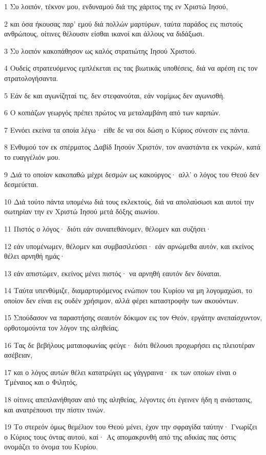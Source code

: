 \par 1 Συ λοιπόν, τέκνον μου, ενδυναμού διά της χάριτος της εν Χριστώ Ιησού,
\par 2 και όσα ήκουσας παρ' εμού διά πολλών μαρτύρων, ταύτα παράδος εις πιστούς ανθρώπους, οίτινες θέλουσιν είσθαι ικανοί και άλλους να διδάξωσι.
\par 3 Συ λοιπόν κακοπάθησον ως καλός στρατιώτης Ιησού Χριστού.
\par 4 Ουδείς στρατευόμενος εμπλέκεται εις τας βιωτικάς υποθέσεις, διά να αρέση εις τον στρατολογήσαντα.
\par 5 Εάν δε και αγωνίζηταί τις, δεν στεφανούται, εάν νομίμως δεν αγωνισθή.
\par 6 Ο κοπιάζων γεωργός πρέπει πρώτος να μεταλαμβάνη από των καρπών.
\par 7 Εννόει εκείνα τα οποία λέγω· είθε δε να σοι δώση ο Κύριος σύνεσιν εις πάντα.
\par 8 Ενθυμού τον εκ σπέρματος Δαβίδ Ιησούν Χριστόν, τον αναστάντα εκ νεκρών, κατά το ευαγγέλιόν μου.
\par 9 Διά το οποίον κακοπαθώ μέχρι δεσμών ως κακούργος· αλλ' ο λόγος του Θεού δεν δεσμεύεται.
\par 10 Διά τούτο πάντα υπομένω διά τους εκλεκτούς, διά να απολαύσωσι και αυτοί την σωτηρίαν την εν Χριστώ Ιησού μετά δόξης αιωνίου.
\par 11 Πιστός ο λόγος· διότι εάν συναπεθάνομεν, θέλομεν και συζήσει·
\par 12 εάν υπομένωμεν, θέλομεν και συμβασιλεύσει· εάν αρνώμεθα αυτόν, και εκείνος θέλει αρνηθή ημάς·
\par 13 εάν απιστώμεν, εκείνος μένει πιστός· να αρνηθή εαυτόν δεν δύναται.
\par 14 Ταύτα υπενθύμιζε, διαμαρτυρόμενος ενώπιον του Κυρίου να μη λογομαχώσι, το οποίον δεν είναι εις ουδέν χρήσιμον, αλλά φέρει καταστροφήν των ακουόντων.
\par 15 Σπούδασον να παραστήσης σεαυτόν δόκιμον εις τον Θεόν, εργάτην ανεπαίσχυντον, ορθοτομούντα τον λόγον της αληθείας.
\par 16 Τας δε βεβήλους ματαιοφωνίας φεύγε· διότι θέλουσι προχωρήσει εις πλειοτέραν ασέβειαν,
\par 17 και ο λόγος αυτών θέλει κατατρώγει ως γάγγραινα· εκ των οποίων είναι ο Υμέναιος και ο Φιλητός,
\par 18 οίτινες απεπλανήθησαν από της αληθείας, λέγοντες ότι έγεινεν ήδη η ανάστασις, και ανατρέπουσι την πίστιν τινών.
\par 19 Το στερεόν όμως θεμέλιον του Θεού μένει, έχον την σφραγίδα ταύτην· Γνωρίζει ο Κύριος τους όντας αυτού, καί· Ας απομακρυνθή από της αδικίας πας όστις ονομάζει το όνομα του Κυρίου.
